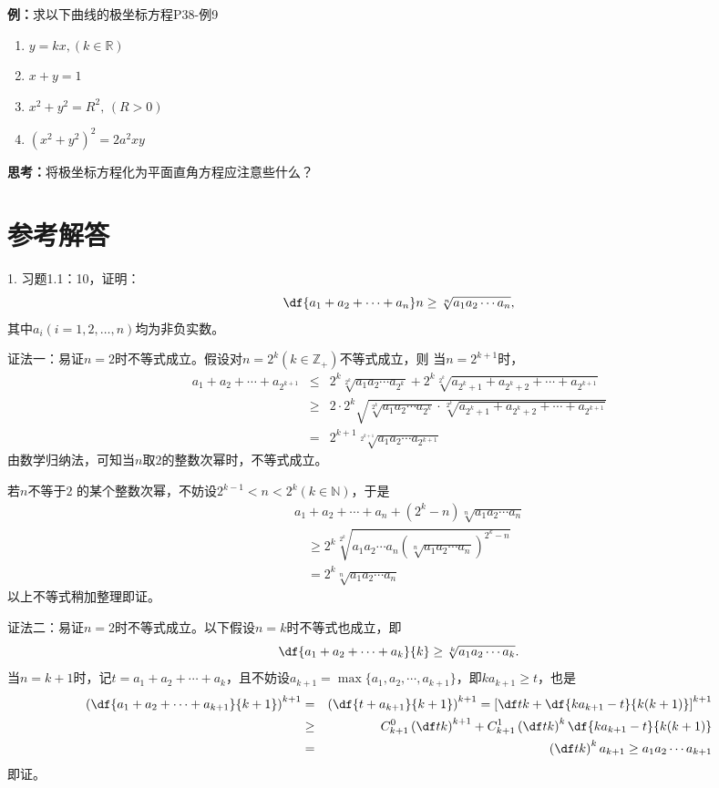 {{\bf 例：}求以下曲线的极坐标方程\hfill P38-例9}
		
\begin{enumerate}[(1)]
  \setlength{\itemindent}{1cm}
  \item $y=kx,(k\in\mathbb{R})$
  \item $x+y=1$
  \item $x^2+y^2=R^2,\,(R>0)$
  \item $(x^2+y^2)^2=2a^2xy$
\end{enumerate}
	
{\bf 思考：}将极坐标方程化为平面直角方程应注意些什么？

\newpage

\section*{参考解答}

1. 习题1.1：10，证明：
$$\df{a_1+a_2+\cdots+a_n}n\geq\sqrt[n]{a_1a_2\cdots a_n},$$
其中$a_i(i=1,2,\ldots,n)$均为非负实数。

证法一：易证$n=2$时不等式成立。假设对$n=2^k(k\in\mathbb{Z}_+)$不等式成立，则
当$n=2^{k+1}$时，
\begin{eqnarray*}
	a_1+a_2+\cdots+a_{2^{k+1}}&\leq&2^k\sqrt[2^k]{a_1a_2\cdots a_{2^k}}
	+2^k\sqrt[2^k]{a_{2^k+1}+a_{2^k+2}+\cdots+a_{2^{k+1}}}\\
	&\geq&2\cdot 2^k\sqrt{\sqrt[2^k]{a_1a_2\cdots a_{2^k}}\cdot
	\sqrt[2^k]{a_{2^k+1}+a_{2^k+2}+\cdots+a_{2^{k+1}}}}\\
	&=&2^{k+1}\sqrt[2^{k+1}]{a_1a_2\cdots a_{2^{k+1}}}
\end{eqnarray*}
由数学归纳法，可知当$n$取$2$的整数次幂时，不等式成立。

若$n$不等于$2$
的某个整数次幂，不妨设$2^{k-1}<n<2^k(k\in\mathbb{N})$，于是
\begin{eqnarray*}
	& &a_1+a_2+\cdots+a_n+\left(2^k-n\right)\sqrt[n]{a_1a_2\cdots a_n}\\
	& & \quad\geq 2^k\sqrt[2^k]{a_1a_2\cdots a_n\left(\sqrt[n]{a_1a_2\cdots
	a_n}\right)^{2^k-n}}\\
	& &\quad =2^k\sqrt[n]{a_1a_2\cdots a_n}
\end{eqnarray*}
以上不等式稍加整理即证。

证法二：易证$n=2$时不等式成立。以下假设$n=k$时不等式也成立，即
$$\df{a_1+a_2+\cdots+a_k}{k}\geq\sqrt[k]{a_1a_2\cdots a_k}.$$
当$n=k+1$时，记$t=a_1+a_2+\cdots+a_k$，且不妨设$a_{k+1}=\max\{a_1,a_2,
\cdots,a_{k+1}\}$，即$ka_{k+1}\geq t$，也是
\begin{eqnarray*}
	\left(\df{a_1+a_2+\cdots+a_{k+1}}{k+1}\right)^{k+1}
	&=&\left(\df{t+a_{k+1}}{k+1}\right)^{k+1}
	=\left[\df tk+\df{ka_{k+1}-t}{k(k+1)}\right]^{k+1}\\
	&\geq&C_{k+1}^0\left(\df tk\right)^{k+1}+C_{k+1}^1\left(\df tk\right)^k
	\df{ka_{k+1}-t}{k(k+1)}\\
	&=&\left(\df tk\right)^ka_{k+1}\geq a_1a_2\cdots a_{k+1}
\end{eqnarray*}
即证。
\bigskip

